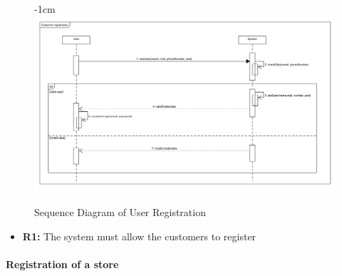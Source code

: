 \documentclass{article}
\begin{document}
\begin{center}
\begin{adjustwidth}{-2.8cm}{}
\begin{tabular}[h!]{|m{7.5em}|m{36em}|}
					\end{tabular}

					
					

					\begin{figure}[!h]
						\begin{adjustwidth} {-1cm}{}
							\includegraphics[scale=0.36]{SD/1_customerRegistration.pdf}
						\end{adjustwidth}
						\caption{Sequence Diagram of User Registration}
					\end{figure}

					

					\end{adjustwidth}
					\begin{itemize}
					\medskip
					 {\bfseries Required functional requirements: }
					\item {\bfseries R1: } The system must allow the customers to register


					\end{itemize}
				\end{center}
		\bigskip
			\paragraph{Registration of a store}
			
\end{document}

